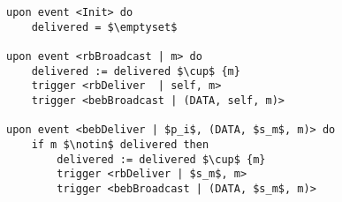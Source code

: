 \begin{lstlisting}[mathescape, caption= Eager reliable broadcast, captionpos=b]
upon event <Init> do
    delivered = $\emptyset$

upon event <rbBroadcast | m> do
    delivered := delivered $\cup$ {m}
    trigger <rbDeliver  | self, m>
    trigger <bebBroadcast | (DATA, self, m)>

upon event <bebDeliver | $p_i$, (DATA, $s_m$, m)> do
    if m $\notin$ delivered then
        delivered := delivered $\cup$ {m}
        trigger <rbDeliver | $s_m$, m>
        trigger <bebBroadcast | (DATA, $s_m$, m)>
\end{lstlisting}
